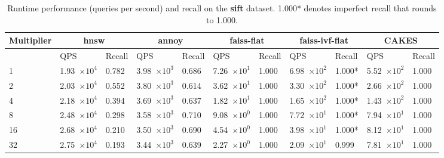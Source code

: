 \begin{table}[!t]
    \caption{Runtime performance (queries per second) and recall on the \textbf{sift} dataset. 1.000* denotes imperfect recall that rounds to 1.000.}
    \label{table:results:ann-sift}
    \vskip 0.15in
    \begin{center}
        \begin{small}
            \begin{sc}
                \begin{tabular}{|l|p{1.2cm}|p{0.8cm}|p{1.2cm}|p{0.8cm}|p{1.2cm}|p{0.8cm}|p{1.2cm}|p{0.8cm}|p{1.2cm}|p{0.8cm}|}
                    \hline
                    \textbf{Multiplier}  & \multicolumn{2}{|c|}{\textbf{hnsw}}  & \multicolumn{2}{|c|}{\textbf{annoy}} & \multicolumn{2}{|c|}{\textbf{faiss-flat}} & \multicolumn{2}{|c|}{\textbf{faiss-ivf-flat}}  & \multicolumn{2}{|c|}{\textbf{CAKES}} \\
                    \hline
                    &             QPS & Recall        & QPS & Recall      & QPS & Recall       & QPS & Recall    & QPS & Recall    \\
                    \hline
                    1   & 1.93~$\times10^{4}$ & 0.782 & 3.98~$\times10^{3}$ & 0.686 & 7.26~$\times10^{1}$  & 1.000 & 6.98~$\times10^{2}$ & 1.000* & 5.52~$\times10^{2}$ & 1.000 \\
                    \hline
                    2   & 2.03~$\times10^{4}$ & 0.552 & 3.80~$\times10^{3}$ & 0.614 & 3.62~$\times10^{1}$  & 1.000 & 3.30~$\times10^{2}$ & 1.000* & 2.66~$\times10^{2}$ & 1.000 \\
                    \hline
                    4   & 2.18~$\times10^{4}$ & 0.394 & 3.69~$\times10^{3}$ & 0.637 & 1.82~$\times10^{1}$  & 1.000 & 1.65~$\times10^{2}$ & 1.000* & 1.43~$\times10^{2}$ & 1.000 \\
                    \hline
                    8   & 2.48~$\times10^{4}$ & 0.298 & 3.58~$\times10^{3}$ & 0.710 & 9.08~$\times10^{0}$  & 1.000 & 7.72~$\times10^{1}$ & 1.000* & 7.94~$\times10^{1}$ & 1.000 \\
                    \hline
                    16  & 2.68~$\times10^{4}$ & 0.210 & 3.50~$\times10^{3}$ & 0.690 & 4.54~$\times10^{0}$  & 1.000 & 3.98~$\times10^{1}$ & 1.000* & 8.12~$\times10^{1}$ & 1.000 \\
                    \hline
                    32  & 2.75~$\times10^{4}$ & 0.193 & 3.44~$\times10^{3}$ & 0.639 & 2.27~$\times10^{0}$  & 1.000 & 2.09~$\times10^{1}$ & 0.999  & 7.81~$\times10^{1}$ & 1.000 \\

\end{tabular}
\end{sc}
\end{small}
\end{center}
\end{table}
